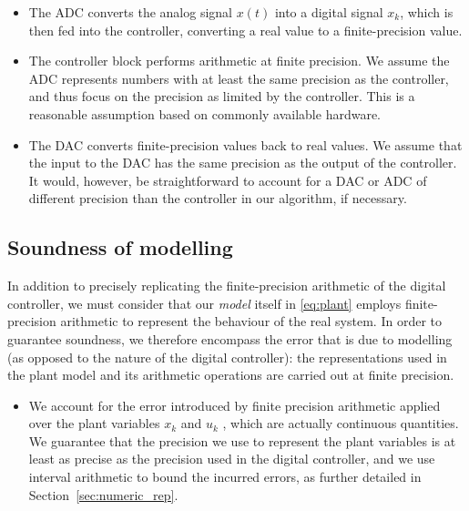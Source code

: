 \begin{itemize}

\item The ADC converts the analog signal $x(t)$ into a digital signal $x_k$, which is then fed into the controller, converting a real value to a finite-precision value.  

\item The controller block performs arithmetic at finite precision. 
We assume the ADC represents numbers with at least the same precision as the controller, 
and thus focus on the precision as limited by the controller. 
This is a reasonable assumption based on commonly available hardware. 

\item The DAC converts finite-precision values back to real values. 
We assume that the input to the DAC has the same precision as the output of the controller. 
It would, however, be straightforward to account for a DAC or ADC of different precision than the controller in our algorithm, if necessary. 
\end{itemize}

\subsection{Soundness of modelling}

In addition to precisely replicating the finite-precision arithmetic of the digital controller, 
we must consider that our \emph{model} itself in \eqref{eq:plant} employs finite-precision arithmetic to represent the behaviour of the real system. 
In order to guarantee soundness, we therefore encompass the error that is due to modelling (as opposed to the nature of the digital controller):   
the representations used in the plant model and its arithmetic operations are carried out at finite precision.  
\begin{itemize} 
\item
We account for the error introduced by finite precision arithmetic applied over the plant variables $x_k$ and $u_k$ , which are actually continuous quantities. 
We guarantee that the precision we use to represent the plant variables is at least as precise as the precision used in the digital controller, 
and we use interval arithmetic to bound the incurred errors, as further detailed in Section~\ref{sec:numeric_rep}. 
\end{itemize}


